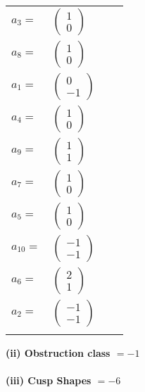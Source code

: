 \documentclass[1p]{elsarticle_modified}
\theoremstyle{definition}
\begin{document}
\begin{tabular}{m{7pt} m{180pt} m{7pt} m{180pt} }
\flushright $a_{3}=$&$\begin{pmatrix}1\\0\end{pmatrix}$ \\
\flushright $a_{8}=$&$\begin{pmatrix}1\\0\end{pmatrix}$ \\
\flushright $a_{1}=$&$\begin{pmatrix}0\\-1\end{pmatrix}$ \\
\flushright $a_{4}=$&$\begin{pmatrix}1\\0\end{pmatrix}$ \\
\flushright $a_{9}=$&$\begin{pmatrix}1\\1\end{pmatrix}$ \\
\flushright $a_{7}=$&$\begin{pmatrix}1\\0\end{pmatrix}$ \\
\flushright $a_{5}=$&$\begin{pmatrix}1\\0\end{pmatrix}$ \\
\flushright $a_{10}=$&$\begin{pmatrix}-1\\-1\end{pmatrix}$ \\
\flushright $a_{6}=$&$\begin{pmatrix}2\\1\end{pmatrix}$ \\
\flushright $a_{2}=$&$\begin{pmatrix}-1\\-1\end{pmatrix}$\\&\end{tabular}
\flushleft \textbf{(ii) Obstruction class $= -1$}\\~\\
\flushleft \textbf{(iii) Cusp Shapes $= -6$}\\~\\
\end{document}
